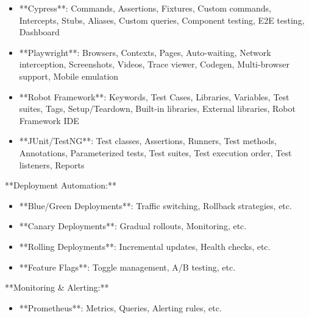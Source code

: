 \documentclass[11pt,a4paper]{article}
\begin{document}
\begin{itemize}
\item **Cypress**: Commands, Assertions, Fixtures, Custom commands, Intercepts, Stubs, Aliases, Custom queries, Component testing, E2E testing, Dashboard
\end{itemize}

\begin{itemize}
\item **Playwright**: Browsers, Contexts, Pages, Auto-waiting, Network interception, Screenshots, Videos, Trace viewer, Codegen, Multi-browser support, Mobile emulation
\end{itemize}

\begin{itemize}
\item **Robot Framework**: Keywords, Test Cases, Libraries, Variables, Test suites, Tags, Setup/Teardown, Built-in libraries, External libraries, Robot Framework IDE
\end{itemize}

\begin{itemize}
\item **JUnit/TestNG**: Test classes, Assertions, Runners, Test methods, Annotations, Parameterized tests, Test suites, Test execution order, Test listeners, Reports
\end{itemize}

**Deployment Automation:**

\begin{itemize}
\item **Blue/Green Deployments**: Traffic switching, Rollback strategies, etc.
\end{itemize}

\begin{itemize}
\item **Canary Deployments**: Gradual rollouts, Monitoring, etc.
\end{itemize}

\begin{itemize}
\item **Rolling Deployments**: Incremental updates, Health checks, etc.
\end{itemize}

\begin{itemize}
\item **Feature Flags**: Toggle management, A/B testing, etc.
\end{itemize}

**Monitoring \& Alerting:**

\begin{itemize}
\item **Prometheus**: Metrics, Queries, Alerting rules, etc.
\end{itemize}
\end{document}
